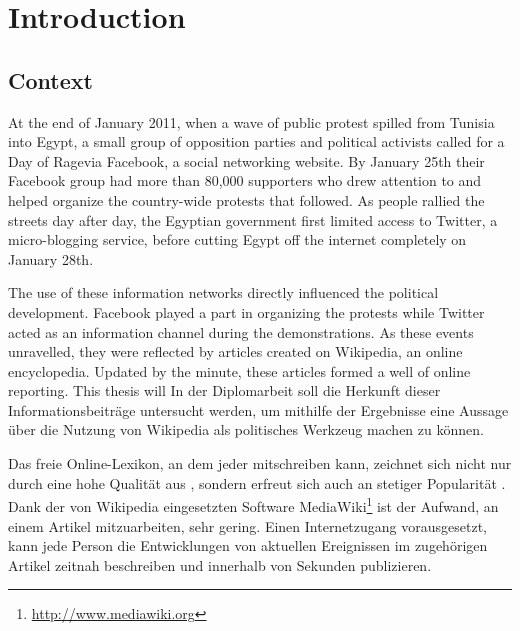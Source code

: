 \chapter{Introduction}\label{ch:introduction}

\section{Context}

At the end of January 2011, when a wave of public protest spilled from Tunisia into Egypt, a small group of opposition parties and political activists called for a \glqq Day of Rage\grqq via Facebook, a social networking website.
By January 25th their Facebook group had more than 80,000 supporters who drew attention to and helped organize the country-wide protests that followed. 
As people rallied the streets day after day, the Egyptian government first limited access to Twitter, a micro-blogging service, before cutting Egypt off the internet completely on January 28th.\cite{econ18013760, szegypt}


The use of these information networks directly influenced the political development.
Facebook played a part in organizing the protests while Twitter acted as an information channel during the demonstrations.
As these events unravelled, they were reflected by articles created on Wikipedia, an online encyclopedia.
Updated by the minute, these articles formed a well of online reporting.\cite{wikiegypt}
This thesis will 
In der Diplomarbeit soll die Herkunft dieser Informationsbeiträge untersucht werden, um mithilfe der Ergebnisse eine Aussage über die Nutzung von Wikipedia als politisches Werkzeug machen zu können. 


Das freie Online-Lexikon, an dem jeder mitschreiben kann, zeichnet sich nicht nur durch eine hohe Qualität aus \cite{giles2005internet}, sondern erfreut sich auch an stetiger Popularität \cite{wikipv}. 
Dank der von Wikipedia eingesetzten Software MediaWiki\footnote{\url{http://www.mediawiki.org}} ist der Aufwand, an einem Artikel mitzuarbeiten, sehr gering.
Einen Internetzugang vorausgesetzt, kann jede Person die Entwicklungen von aktuellen Ereignissen im zugehörigen Artikel zeitnah beschreiben und innerhalb von Sekunden publizieren.

